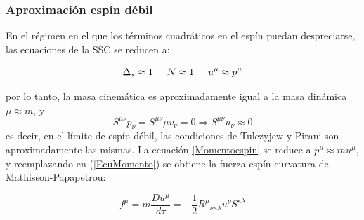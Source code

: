 \documentclass[aspectratio=169,10pt,usenames,dvipsnames,spanish]{beamer}
\begin{document}

\begin{frame}
\frametitle{Aproximación espín débil}
En el régimen en el que los términos cuadráticos en el espín puedan despreciarse, las ecuaciones de la SSC se reducen a:

\begin{equation}\label{aproximaciones}
	\Delta_s \approx 1 \hspace{0.5cm} N \approx 1 \hspace{0.5cm} u^\mu \approx p^\mu
\end{equation}

por lo tanto, la masa cinemática es aproximadamente igual a la masa dinámica $\mu \approx m$, y
\begin{equation}\label{Condiciones TSSC y PSSC}
	S^{\mu\nu}p_\nu=S^{\mu\nu}\mu v_\nu=0   \Longrightarrow   S^{\mu\nu} u_\nu \approx 0
\end{equation}
es decir, en el límite de espín débil, las condiciones de Tulczyjew y Pirani son aproximadamente las mismas. La ecuación \ref{Momentoespin} se reduce a $p^\mu \approx mu^\mu$, y reemplazando en (\ref{EcuMomento}) se obtiene la fuerza espín-curvatura de Mathisson-Papapetrou:

\begin{equation}\label{FuerzaMPD}
	f^\mu=m \frac{D u^\mu}{d \tau}=- \frac{1}{2} R^\mu{}_{\nu\kappa\lambda}u^\nu S^{\kappa\lambda}
\end{equation}
\end{frame}
\end{document}
